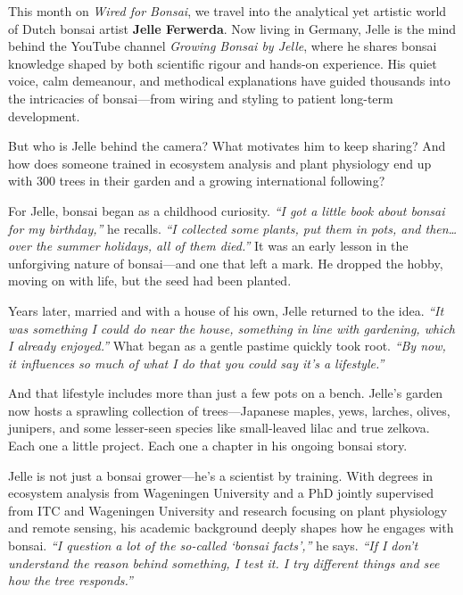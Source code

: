 \label{2025-06-wired}
\noindent
This month on \textit{Wired for Bonsai}, we travel into the analytical yet artistic world of Dutch bonsai artist \textbf{Jelle Ferwerda}. Now living in Germany, Jelle is the mind behind the YouTube channel \textit{Growing Bonsai by Jelle}, where he shares bonsai knowledge shaped by both scientific rigour and hands\--on experience. His quiet voice, calm demeanour, and methodical explanations have guided thousands into the intricacies of bonsai---from wiring and styling to patient long\--term development.

But who is Jelle behind the camera?
What motivates him to keep sharing?
And how does someone trained in ecosystem analysis and plant physiology end up with 300 trees in their garden and a growing international following?

\medskip
{}
\noindent
For Jelle, bonsai began as a childhood curiosity. \textit{``I got a little book about bonsai for my birthday,''} he recalls. \textit{``I collected some plants, put them in pots, and then\dots{} over the summer holidays, all of them died.''} It was an early lesson in the unforgiving nature of bonsai---and one that left a mark. He dropped the hobby, moving on with life, but the seed had been planted.

Years later, married and with a house of his own, Jelle returned to the idea. \textit{``It was something I could do near the house, something in line with gardening, which I already enjoyed.''} What began as a gentle pastime quickly took root. \textit{``By now, it influences so much of what I do that you could say it's a lifestyle.''}

And that lifestyle includes more than just a few pots on a bench. Jelle's garden now hosts a sprawling collection of trees---Japanese maples, yews, larches, olives, junipers, and some lesser\--seen species like small\--leaved lilac and true zelkova. Each one a little project. Each one a chapter in his ongoing bonsai story.

\noindent
Jelle is not just a bonsai grower---he's a scientist by training.
With degrees in ecosystem analysis from Wageningen University and a PhD jointly supervised from ITC and Wageningen University and research focusing on plant physiology and remote sensing, his academic background deeply shapes how he engages with bonsai.
\textit{``I question a lot of the so\--called `bonsai facts',''} he says.
\textit{``If I don't understand the reason behind something, I test it. I try different things and see how the tree responds.''}

